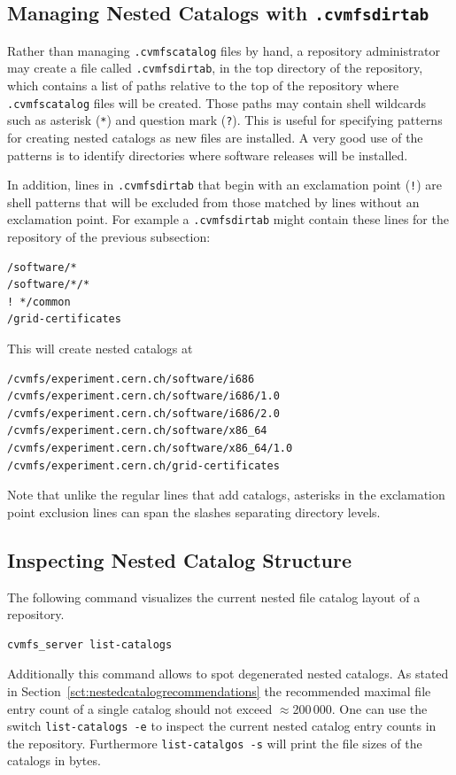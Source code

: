 \subsection{Managing Nested Catalogs with \texttt{.cvmfsdirtab}}
\label{sct:dirtab}
Rather than managing \texttt{.cvmfscatalog} files by hand, a repository administrator may create a file called \texttt{.cvmfsdirtab}, in the top directory of the repository, which contains a list of paths relative to the top of the repository where \texttt{.cvmfscatalog} files will be created.
Those paths may contain shell wildcards such as asterisk (\texttt{*}) and question mark (\texttt{?}).
This is useful for specifying patterns for creating nested catalogs as new files are installed.
A very good use of the patterns is to identify directories where software releases will be installed.

In addition, lines in \texttt{.cvmfsdirtab} that begin with an exclamation point (\texttt{!}) are shell patterns that will be excluded from those matched by lines without an exclamation point.
For example a \texttt{.cvmfsdirtab} might contain these lines for the repository of the previous subsection:
\begin{verbatim}
/software/*
/software/*/*
! */common
/grid-certificates
\end{verbatim}
This will create nested catalogs at
\begin{verbatim}
/cvmfs/experiment.cern.ch/software/i686
/cvmfs/experiment.cern.ch/software/i686/1.0
/cvmfs/experiment.cern.ch/software/i686/2.0
/cvmfs/experiment.cern.ch/software/x86_64
/cvmfs/experiment.cern.ch/software/x86_64/1.0
/cvmfs/experiment.cern.ch/grid-certificates
\end{verbatim}
Note that unlike the regular lines that add catalogs, asterisks in the exclamation point exclusion lines can span the slashes separating directory levels.

\subsection{Inspecting Nested Catalog Structure}
\label{sct:inspectnestedcatalogs}
The following command visualizes the current nested file catalog layout of a repository.

\begin{verbatim}
cvmfs_server list-catalogs
\end{verbatim}

Additionally this command allows to spot degenerated nested catalogs.
As stated in Section~\ref{sct:nestedcatalogrecommendations} the recommended maximal file entry count of a single catalog should not exceed $\approx$200\,000.
One can use the switch \texttt{list-catalogs -e} to inspect the current nested catalog entry counts in the repository.
Furthermore \texttt{list-catalgos -s} will print the file sizes of the catalogs in bytes.


